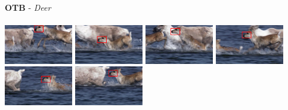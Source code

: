 \documentclass[10pt,twocolumn,letterpaper,french]{article}
\begin{document}
\begin{appendices}
\begin{center}
  \textbf{OTB} - \textit{Deer}\\
  \hspace{1cm}\\
  \includegraphics[width=85pt]{images/exemples/ok/deer/000001.png}
  \includegraphics[width=85pt]{images/exemples/ok/deer/000021.png}
  \includegraphics[width=85pt]{images/exemples/ok/deer/000028.png}
  \includegraphics[width=85pt]{images/exemples/ok/deer/000035.png}
  \includegraphics[width=85pt]{images/exemples/ok/deer/000059.png}
  \includegraphics[width=85pt]{images/exemples/ok/deer/000070.png}\\
  \hspace{1cm}\\
  \hspace{1cm}\\


\end{center}
\end{appendices}
\end{document}
